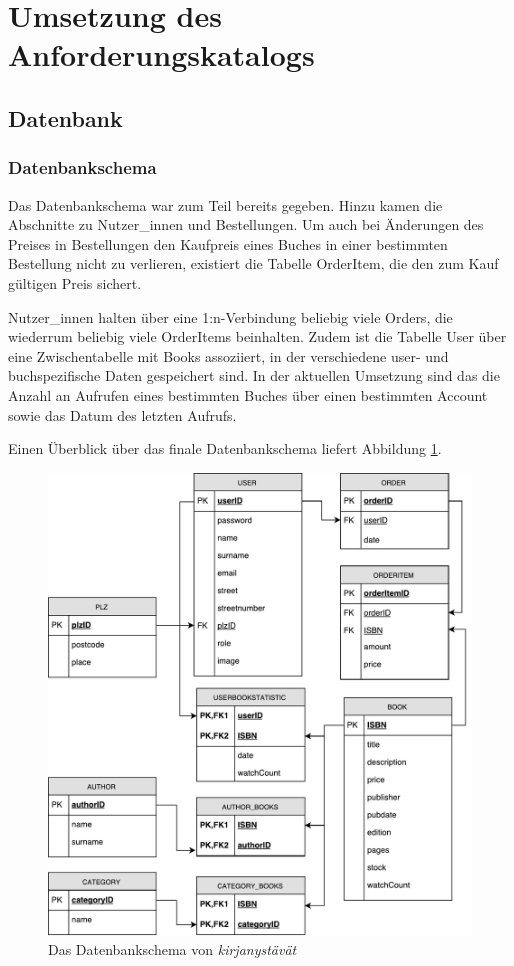 \section{Umsetzung des Anforderungskatalogs}\label{sec:umsetzung}
	\subsection{Datenbank}\label{sec:umsetzung:DB:DBS}
		\subsubsection{Datenbankschema}\label{sec:umsetzung:DB:Schema}
		Das Datenbankschema war zum Teil bereits gegeben. Hinzu kamen die Abschnitte zu Nutzer\_innen und Bestellungen. Um auch bei Änderungen des Preises in Bestellungen den Kaufpreis eines Buches in einer bestimmten Bestellung nicht zu verlieren, existiert die Tabelle OrderItem, die den zum Kauf gültigen Preis sichert.
		
		Nutzer\_innen halten über eine 1:n-Verbindung beliebig viele Orders, die wiederrum beliebig viele OrderItems beinhalten. Zudem ist die Tabelle User über eine Zwischentabelle mit Books assoziiert, in der verschiedene user- und buchspezifische Daten gespeichert sind. In der aktuellen Umsetzung sind das die Anzahl an Aufrufen eines bestimmten Buches über einen bestimmten Account sowie das Datum des letzten Aufrufs.
		
		Einen Überblick über das finale Datenbankschema liefert Abbildung \ref{fig:db-schema}.
	
       \begin{figure}[h]
		 \centering
		\includegraphics[width=\linewidth]{files/db-schema}
		\caption{Das Datenbankschema von \textit{kirjanystävät}}
		\label{fig:db-schema}
		\end{figure}

